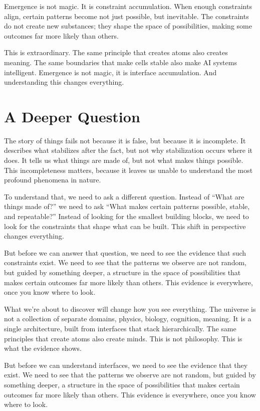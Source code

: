 \documentclass[
  openright]{book}
\begin{document}
Emergence is not magic. It is
constraint accumulation. When enough constraints
align, certain patterns become not just possible, but inevitable. The
constraints do not create new substances; they shape the
space of possibilities, making some outcomes
far more likely than others.

This is extraordinary. The same principle that creates atoms also
creates meaning. The same boundaries that make cells stable also make AI
systems intelligent. Emergence is not magic, it is interface
accumulation. And understanding this changes everything.

\section{A Deeper Question}\label{a-deeper-question}

The story of things fails not because it is false, but because it is
incomplete. It describes what stabilizes after the fact, but not why
stabilization occurs where it does. It tells us what things are made of,
but not what makes things possible. This incompleteness matters, because
it leaves us unable to understand the most profound phenomena in nature.

To understand that, we need to ask a different question. Instead of
``What are things made of?'' we need to ask ``What makes certain
patterns possible, stable, and repeatable?'' Instead of looking for the
smallest building blocks, we need to look for the constraints that shape
what can be built. This shift in perspective changes everything.

But before we can answer that question, we need to see the evidence that
such constraints exist. We need to see that the patterns we observe are
not random, but guided by something deeper, a structure in the space of
possibilities that makes certain outcomes far more likely than others.
This evidence is everywhere, once you know where to look.

What we're about to discover will change how you see everything. The
universe is not a collection of separate domains, physics, biology,
cognition, meaning. It is a single architecture, built from interfaces
that stack hierarchically. The same principles that create atoms also
create minds. This is not philosophy. This is what the evidence shows.

But before we can understand interfaces, we need to see the evidence
that they exist. We need to see that the patterns we observe are not
random, but guided by something deeper, a structure in the space of
possibilities that makes certain outcomes far more likely than others.
This evidence is everywhere, once you know where to look.
\end{document}
